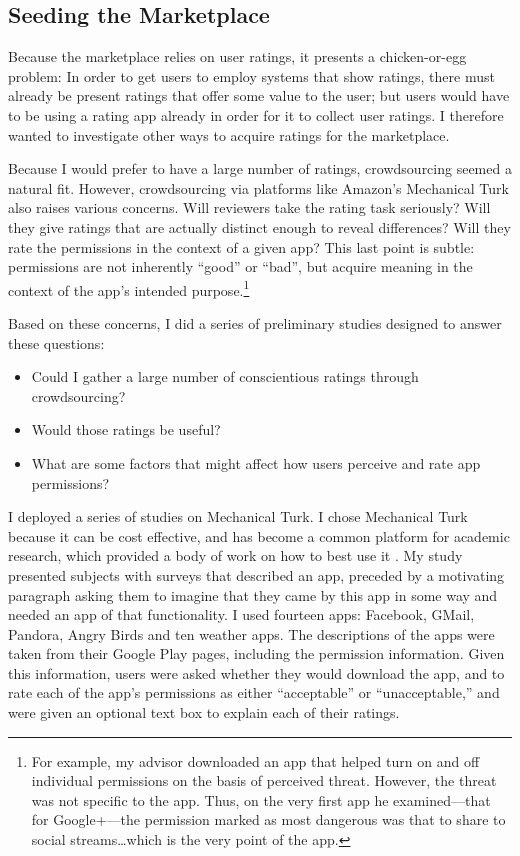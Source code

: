 \documentclass[11pt]{article}
\begin{document}
\subsection{Seeding the Marketplace}
\label{subsec-seeding}
Because the marketplace relies on user ratings, it presents 
a chicken-or-egg problem: In order to get users
to employ systems that show ratings, there must already be present
ratings that offer some value to the user; but users would have to be
using a rating app already in order for it to collect user
ratings. I therefore wanted to investigate other ways to
acquire ratings for the marketplace.

Because I would prefer to have a large number of ratings,
crowdsourcing seemed a natural fit. However, crowdsourcing via
platforms like Amazon's Mechanical Turk also raises various concerns. Will
reviewers take the rating task seriously? Will they give ratings that
are actually distinct enough to reveal differences? Will they rate the
permissions in the context of a given app? This last point is subtle: permissions are
not inherently ``good'' or ``bad'', but acquire meaning in the context
of the app's intended purpose.\footnote{For example, my advisor
  downloaded an app that helped turn on and off individual permissions
  on the basis of perceived threat. However, the threat was not
  specific to the app. Thus, on the very first app he examined---that
  for Google+---the permission marked as most dangerous was that to
  share to social streams\dots which is the very point of the app.}

Based on these concerns, I did a series of preliminary studies designed to answer
these questions:
\begin{itemize}
\item Could I gather a large number of conscientious ratings through crowdsourcing?
\item Would those ratings be useful?
\item What are some factors that might affect how users perceive and rate 
app permissions?
\end{itemize}
I deployed a series of studies on Mechanical Turk. I chose
Mechanical Turk because it can be cost effective, and has become
a common platform for academic research, which provided a body of work on how
to best use it \cite{reseach-mturk-BRM12, mturk-data-quality-PPS11}. 
My study presented subjects with surveys that
described an app, preceded by a motivating paragraph asking
them to imagine that they came by this app in some way and needed an
app of that functionality.  I used fourteen apps: Facebook, GMail,
Pandora, Angry Birds and ten weather apps.  The descriptions
of the apps were taken from their Google Play pages, including the
permission information. Given this information, users were asked
whether they would download the app, and to rate each of the app's
permissions as either ``acceptable'' or ``unacceptable,'' and were
given an optional text box to explain each of their ratings.
\end{document}
